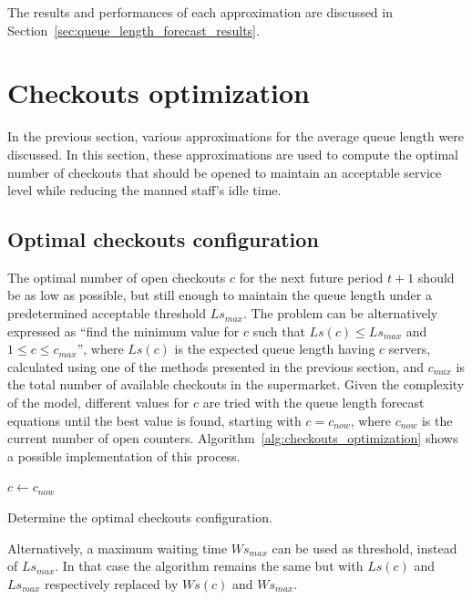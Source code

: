 The results and performances of each approximation are discussed in Section~\ref{sec:queue_length_forecast_results}.

\section{Checkouts optimization}
\label{sec:checkouts_optimization}

In the previous section, various approximations for the average queue length were discussed. In this section, these approximations are used to compute the optimal number of checkouts that should be opened to maintain an acceptable service level while reducing the manned staff’s idle time.

\subsection{Optimal checkouts configuration}
\label{subsec:optimal_checkouts_configuration}

The optimal number of open checkouts \( c \) for the next future period \( t+1 \) should be as low as possible, but still enough to maintain the queue length under a predetermined acceptable threshold \( Ls_{max} \). The problem can be alternatively expressed as “find the minimum value for \( c \) such that \( Ls(c) \leq Ls_{max} \) and \( 1 \leq c \leq c_{max} \)”, where \( Ls(c) \) is the expected queue length having \( c \) servers, calculated using one of the methods presented in the previous section, and \( c_{max} \) is the total number of available checkouts in the supermarket. Given the complexity of the model, different values for \( c \) are tried with the queue length forecast equations until the best value is found, starting with \( c = c_{now} \), where \( c_{now} \) is the current number of open counters. Algorithm~\ref{alg:checkouts_optimization} shows a possible implementation of this process.
\begin{algorithm}
   \;
  $ c \gets c_{now}$\;
  \caption{\label{alg:checkouts_optimization}Determine the optimal checkouts configuration.}
\end{algorithm}

Alternatively, a maximum waiting time \( Ws_{max} \) can be used as threshold, instead of \( Ls_{max} \). In that case the algorithm remains the same but with \( Ls(c) \) and \( Ls_{max} \) respectively replaced by \( Ws(c) \) and \( Ws_{max} \).


